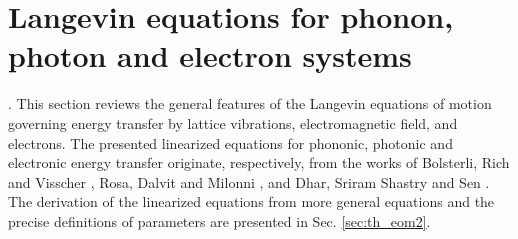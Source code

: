 

% 

\section{Langevin equations for phonon, photon and electron systems}
\label{sec:th_eom1}

. This section reviews the general features of the Langevin equations of motion governing energy transfer by lattice vibrations, electromagnetic field, and electrons. The presented linearized equations for phononic, photonic and electronic energy transfer originate, respectively, from the works of Bolsterli, Rich and Visscher \cite{bolsterli70}, Rosa, Dalvit and Milonni \cite{rosa10,rosa11}, and Dhar, Sriram Shastry and Sen \cite{dhar03,dhar06b}. The derivation of the linearized equations from more general equations and the precise definitions of parameters are presented in Sec. \ref{sec:th_eom2}. %


